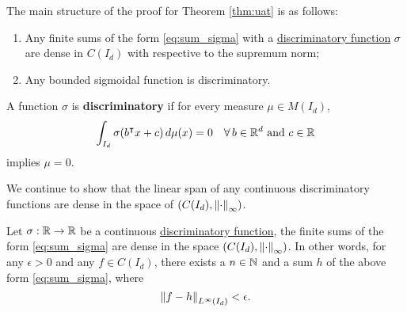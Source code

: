 The main structure of the proof for Theorem \ref{thm:uat} is as follows:
\begin{enumerate}
    \item Any finite sums of the form \eqref{eq:sum_sigma} with a
    \hyperref[def:dis_func]{discriminatory function} $\sigma$ are dense in
    $C(I_d)$ with respective to the supremum norm;
    \item Any bounded sigmoidal function is discriminatory.
\end{enumerate}

\begin{definition}
    \label{def:dis_func}
    A function $\sigma$ is \textbf{discriminatory} if for every measure $\mu \in
    M(I_d)$,
    \begin{equation}
        \int_{I_d} \sigma(b{}^{\intercal} x + c) \,d\mu(x) = 0 \quad 
        \forall \,b \in \mathbb{R}^d \textnormal{ and } c \in \mathbb{R}
    \end{equation}
    implies $\mu = 0$.
\end{definition}

We continue to show that the linear span of any continuous discriminatory
functions are dense in the space of $(C(I_d), \left\| \cdot \right\|_{\infty})$.

\begin{theorem}
    Let $\sigma: \mathbb{R} \to \mathbb{R}$ be a continuous
    \hyperref[def:dis_func]{discriminatory function}, the finite sums of the
    form \eqref{eq:sum_sigma} are dense in the space $(C(I_d),
    \left\| \cdot \right\|_{\infty})$. In other words, for any $\epsilon > 0$ and any $f
    \in C(I_d)$, there exists a $n \in \mathbb{N}$ and a sum $h$ of the above form
    \eqref{eq:sum_sigma}, where
    \begin{equation}
        \left\| f - h \right\|_{L^{\infty}(I_d)} < \epsilon.
    \end{equation}
\end{theorem}

